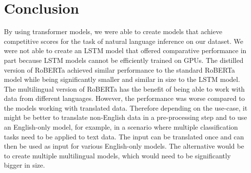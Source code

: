 \documentclass[acmsmall,nonacm]{acmart}
\begin{document}

\section{Conclusion}
By using transformer models, we were able to create models that achieve competitive scores for the task of natural language inference on our dataset. We were not able to create an LSTM model that offered comparative performance in part because LSTM models cannot be efficiently trained on GPUs. The distilled version of RoBERTa achieved similar performance to the standard RoBERTa model while being significantly smaller and similar in size to the LSTM model. 
The multilingual version of RoBERTa has the benefit of being able to work with data from different languages. However, the performance was worse compared to the models working with translated data. Therefore depending on the use-case, it might be better to translate non-English data in a pre-processing step and to use an English-only model, for example, in a scenario where multiple classification tasks need to be applied to text data. The input can be translated once and can then be used as input for various English-only models. The alternative would be to create multiple multilingual models, which would need to be significantly bigger in size.  


\pagebreak  



\end{document}

